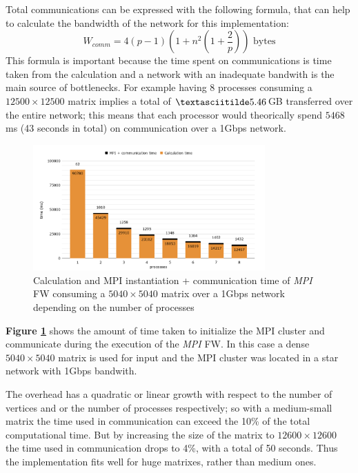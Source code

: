 Total communications can be expressed with the following formula, that can help to calculate the bandwidth of the network
for this implementation:
\[W_{comm} = 4(p-1)(1 + n^2(1 + \frac{2}{p})) \text{ bytes}\]
This formula is important because the time spent on communications is time taken from the calculation and a network with an inadequate
bandwith is the main source of bottlenecks. For example having 8 processes consuming a $12500 \times 12500$ matrix implies a total of
$\textasciitilde 5.46$GB transferred  over the entire network; this means that each processor would theorically spend $5468$ms (43 seconds in total) on communication over a 1Gbps network.

\begin{figure}[h!]
\centering                                                                        
\includegraphics[width=3.5in]{diagrams/mpi-time}
\captionsetup{justification=centering}                                                                                                                                   
\caption{Calculation and MPI instantiation + communication time of \emph{MPI} FW consuming a $5040\times5040$ matrix over a 1Gbps network depending on the number of processes}
\label{fig:mpi-time}                                                                                                                                                           
\end{figure}

\textbf{Figure \ref*{fig:mpi-time}} shows the amount of time taken to initialize the MPI cluster and communicate during the execution of the \emph{MPI} FW. In this case a dense 
$5040\times5040$ matrix is used for input and the MPI cluster was located in a star network with 1Gbps bandwith.

The overhead has a quadratic or linear growth with respect to the number of vertices and or the number of processes respectively; 
so with a medium-small matrix the time used in communication can exceed the 10\% of the total computational time. 
But by increasing the size of the matrix to $12600\times12600$ the time used in communication drops to 4\%, with a total of 50 seconds. Thus the implementation fits well for huge matrixes, rather than medium ones.

